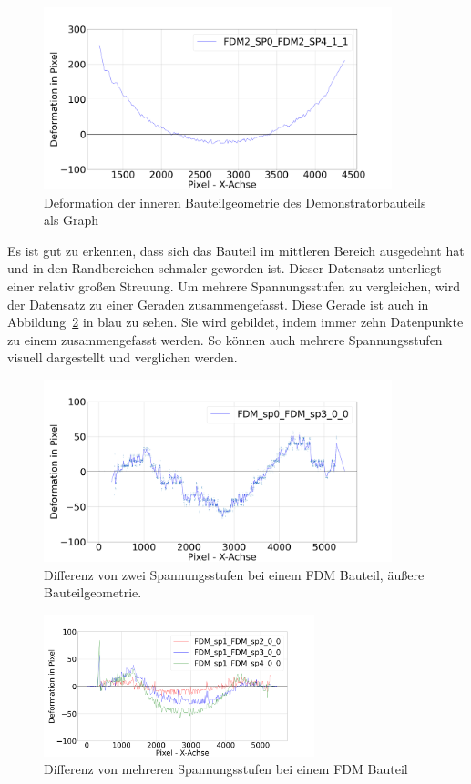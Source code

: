 \begin{figure}[H]
    \centering
    \includegraphics[width=0.9\textwidth]{images/FDM_sp0_sp4_inner.png}
    \caption{Deformation der inneren Bauteilgeometrie 
    des Demonstratorbauteils als Graph}
    \label{fig:deformation_data_graph}
\end{figure}

Es ist gut zu erkennen, dass sich das Bauteil 
im mittleren Bereich ausgedehnt hat und in den Randbereichen schmaler geworden ist.
Dieser Datensatz unterliegt einer relativ großen Streuung. Um mehrere Spannungsstufen
zu vergleichen, wird der Datensatz zu einer Geraden zusammengefasst.
Diese Gerade ist auch in Abbildung~\ref{fig:deformation_data} in blau zu sehen. Sie wird 
gebildet, indem immer zehn Datenpunkte zu einem zusammengefasst werden. 
So können auch mehrere Spannungsstufen visuell dargestellt und verglichen werden.

\begin{figure}[H]
    \centering
    \includegraphics[width=0.9\textwidth]{images/FDM_sp0_sp3_defo_plot.png}
    \caption{Differenz von zwei Spannungsstufen bei einem FDM Bauteil, äußere 
    Bauteilgeometrie.}
    \label{fig:deformation_data}
\end{figure}

\begin{figure}[H]
    \centering
    \includegraphics[width=0.7\textwidth]{images/FDM_sp0_many_defo_plot2.png}
    \caption{Differenz von mehreren Spannungsstufen bei einem FDM Bauteil}
    \label{fig:deformation_data_all}
\end{figure}



